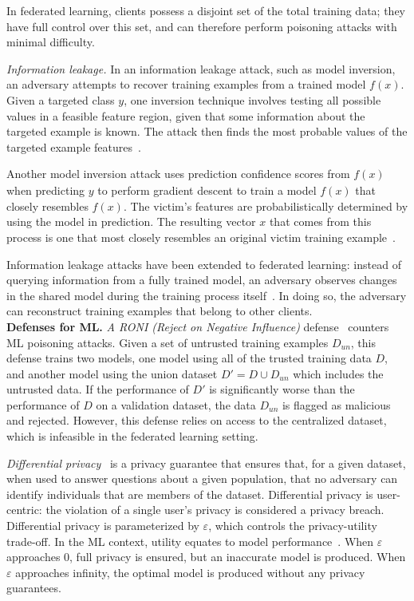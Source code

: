 In federated learning, clients possess a disjoint set of the
total training data; they have full control over this set, and can
therefore perform poisoning attacks with minimal difficulty.

\emph{Information leakage.}  In an information leakage attack, such as
model inversion, an adversary attempts to recover training examples
from a trained model $f(x)$. Given a targeted class $y$, one inversion
technique involves testing all possible values in a feasible feature
region, given that some information about the targeted example is
known. The attack then finds the most probable values of the targeted
example features~\cite{Fredrikson:2014}.

Another model inversion attack uses prediction confidence scores from
$f(x)$ when predicting $y$ to perform gradient descent to train a model
$\hat{f(x)}$ that closely resembles $f(x)$. The victim's features are
probabilistically determined by using the model in prediction. The
resulting vector $x$ that comes from this process is one that
most closely resembles an original victim training 
example~\cite{Fredrikson:2015}. 

Information leakage attacks have been extended to federated learning:
instead of querying information from a fully trained model, an
adversary observes changes in the shared model during the training
process itself~\cite{Hitaj:2017}. In doing so, the adversary can
reconstruct training examples that belong to other clients. \\

\noindent \textbf{Defenses for ML.}  
\emph{A RONI (Reject on Negative Influence)} 
defense~\cite{Barreno:2010} counters ML poisoning attacks. Given a set
of untrusted training examples $D_{un}$, this defense trains two
models, one model using all of the trusted training data $D$, and
another model using the union dataset $D' = D \cup D_{un}$ which
includes the untrusted data. If the performance of $D'$ is
significantly worse than the performance of $D$ on a validation
dataset, the data $D_{un}$ is flagged as malicious and rejected.
However, this defense relies on access to the centralized dataset,
which is infeasible in the federated learning setting.

\emph{Differential privacy}~\cite{Dwork:2014} is a privacy guarantee
that ensures that, for a given dataset, when used to answer questions
about a given population, that no adversary can identify individuals
that are members of the dataset. 
%
Differential privacy is user-centric: the violation of a single user's
privacy is considered a privacy breach. Differential privacy is
parameterized by $\varepsilon$, which controls the privacy-utility
trade-off. In the ML context, utility equates to model 
performance~\cite{Song:2013}. When $\varepsilon$ approaches 0, full
privacy is ensured, but an inaccurate model is produced. When
$\varepsilon$ approaches infinity, the optimal model is produced
without any privacy guarantees.

